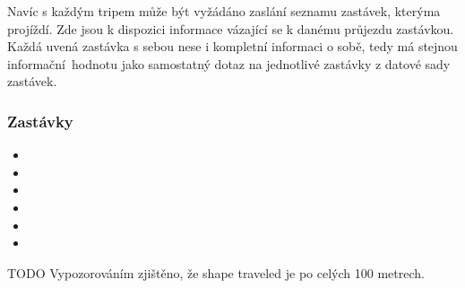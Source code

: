 Navíc s každým tripem může být vyžádáno zaslání seznamu zastávek, kterýma projíždí. Zde jsou k dispozici informace vázající se k danému průjezdu zastávkou. Každá uvená zastávka s sebou nese i kompletní informaci o sobě, tedy má stejnou informační hodnotu jako samostatný dotaz na jednotlivé zastávky z datové sady zastávek.

\subsubsection{Zastávky}

\begin{itemize}
	\item {}

	\item {}

	\item {}

	\item {}

	\item {}

	\item {}
\end{itemize}



TODO Vypozorováním zjištěno, že shape traveled je po celých 100 metrech.
